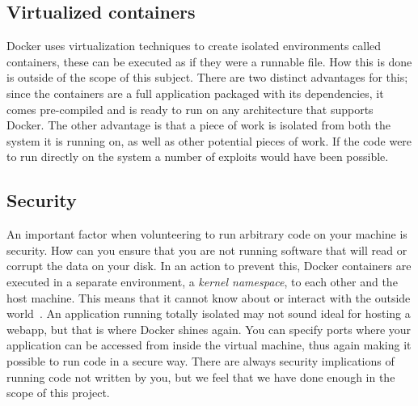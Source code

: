 \subsection{Virtualized containers}
Docker uses virtualization techniques to create isolated environments called containers, these can be executed as if they were a runnable file. How this is done is outside of the scope of this subject.
There are two distinct advantages for this; since the containers are a full application packaged with its dependencies, it comes pre-compiled and is ready to run on any architecture that supports Docker. 
The other advantage is that a piece of work is isolated from both the system it is running on, as well as other potential pieces of work. If the code were to run directly on the system a number of exploits would have been possible.~\cite{korpela:2012}

\subsection{Security}
An important factor when volunteering to run arbitrary code on your machine is security. 
How can you ensure that you are not running software that will read or corrupt the data on your disk. 
In an action to prevent this, Docker containers are executed in a separate environment, a \emph{kernel namespace}, to each other and the host machine. This means that it cannot know about or interact with the outside world~\cite{docker-security}. An application running totally isolated may not sound ideal for hosting a webapp, but that is where Docker shines again. You can specify ports where your application can be accessed from inside the virtual machine, thus again making it possible to run code in a secure way.
There are always security implications of running code not written by you, but we feel that we have done enough in the scope of this project.